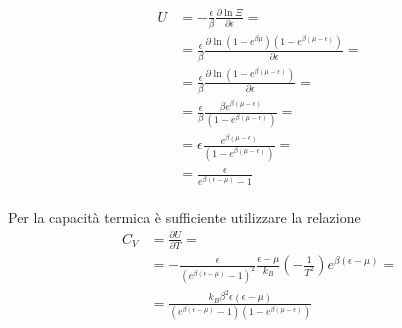 \documentclass[a4paper]{article}
\begin{document}
        \begin{equation*}
            \begin{split}
                U&=-\frac{\epsilon}{\beta}\frac{\partial\ln\Xi}{\partial\epsilon}=\\
                &=\frac{\epsilon}{\beta}\frac{\partial\ln(1-e^{\beta\mu})(1-e^{\beta(\mu-\epsilon)})}{\partial\epsilon}=\\
                &=\frac{\epsilon}{\beta}\frac{\partial\ln(1-e^{\beta(\mu-\epsilon)})}{\partial\epsilon}=\\
                &=\frac{\epsilon}{\beta}\frac{\beta e^{\beta(\mu-\epsilon)}}{(1-e^{\beta(\mu-\epsilon)})}=\\
                &=\epsilon\frac{e^{\beta(\mu-\epsilon)}}{(1-e^{\beta(\mu-\epsilon)})}=\\
                &=\frac{\epsilon}{e^{\beta(\epsilon-\mu)}-1}
            \end{split}
        \end{equation*}
        \\
        Per la capacità termica è sufficiente utilizzare la relazione
        \begin{equation*}
            \begin{split}
                C_V&=\frac{\partial U}{\partial T}=\\
                &=-\frac{\epsilon}{(e^{\beta(\epsilon-\mu)}-1)^2}\frac{\epsilon-\mu}{k_B}\left(-\frac{1}{T^2}\right)e^{\beta(\epsilon-\mu)}=\\
                &=\frac{k_B\beta^2\epsilon(\epsilon-\mu)}{(e^{\beta(\epsilon-\mu)}-1)(1-e^{\beta(\mu-\epsilon)})}
            \end{split}
        \end{equation*}
\end{document}
